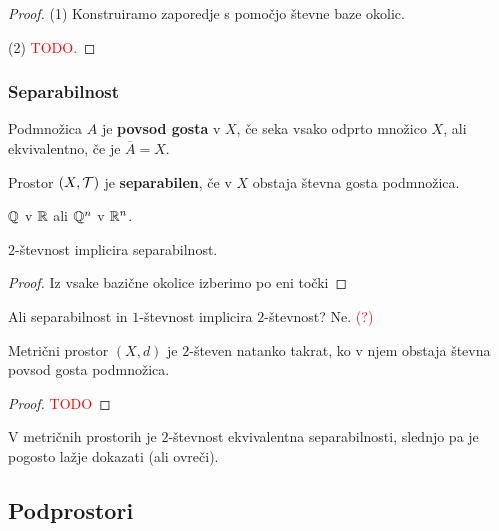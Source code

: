 \begin{proof}
    (1) Konstruiramo zaporedje s pomočjo števne baze okolic.

    (2) \textcolor{red}{TODO.}
\end{proof}

\subsubsection{Separabilnost}
\begin{definicija}
    Podmnožica $A$ je \textbf{povsod gosta} v $X$, če seka vsako odprto množico $X$, ali ekvivalentno, če je $\overline{A} = X$.
\end{definicija}

\begin{definicija}
    Prostor $(X, \mathcal{T})$ je \textbf{separabilen}, če v $X$ obstaja števna gosta podmnožica.
\end{definicija}

\begin{primer}
    $\mathbb{Q}$ v $\mathbb{R}$ ali $\mathbb{Q}^n$ v $\mathbb{R}^n$.
\end{primer}

\begin{trditev}
    $2$-števnost implicira separabilnost.
\end{trditev}

\begin{proof}
    Iz vsake bazične okolice izberimo po eni točki
\end{proof}

\begin{opomba}
    Ali separabilnost in $1$-števnost implicira $2$-števnost? Ne. \textcolor{red}{(?)}
\end{opomba}

\begin{izrek}
    Metrični prostor $(X, d)$ je $2$-števen natanko takrat, ko v njem obstaja števna povsod gosta podmnožica.
\end{izrek}

\begin{proof}
    \textcolor{red}{TODO}
\end{proof}

\begin{opomba}
    V metričnih prostorih je $2$-števnost ekvivalentna separabilnosti, slednjo pa je pogosto lažje dokazati (ali ovreči).
\end{opomba}

\subsection{Podprostori}
